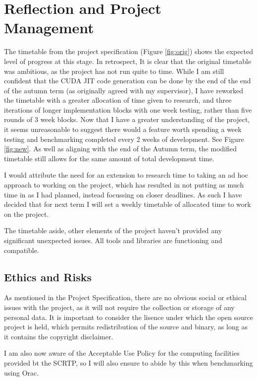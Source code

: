 \documentclass[11pt]{article}
\begin{document}
\section*{Reflection and Project Management}
The timetable from the project specification (Figure \ref{fig:orig}) shows the expected level of progress at this stage. In retrospect, It is clear that the original timetable was ambitious, as the project has not run quite to time. While I am still confident that the CUDA JIT code generation can be done by the end of the end of the autumn term (as originally agreed with my supervisor), I have reworked the timetable with a greater allocation of time given to research, and three iterations of longer implementation blocks with one week testing, rather than five rounds of 3 week blocks. Now that I have a greater understanding of the project, it seems unreasonable to suggest there would a feature worth spending a week testing and benchmarking completed every 2 weeks of development. See Figure \ref{fig:new}. As well as aligning with the end of the Autumn term, the modified timetable still allows for the same amount of total development time.
\par I would attribute the need for an extension to research time to taking an ad hoc approach to working on the project, which has resulted in not putting as much time in as I had planned, instead focussing on closer deadlines. As such I have decided that for next term I will set a weekly timetable of allocated time to work on the project.
\par The timetable aside, other elements of the project haven't provided any significant unexpected issues. All tools and libraries are functioning and compatible.

\subsection*{Ethics and Risks}
As mentioned in the Project Specification, there are no obvious social or ethical issues with the project, as it will not require the collection or storage of any personal data. It is important to consider the lisence under which the open source project is held, which permits redistribution of the source and binary, as long as it contains the copyright disclaimer.
\par I am also now aware of the Acceptable Use Policy\cite{aup} for the computing facilities provided bt the SCRTP, so I will also ensure to abide by this when benchmarking using Orac.
\end{document}
